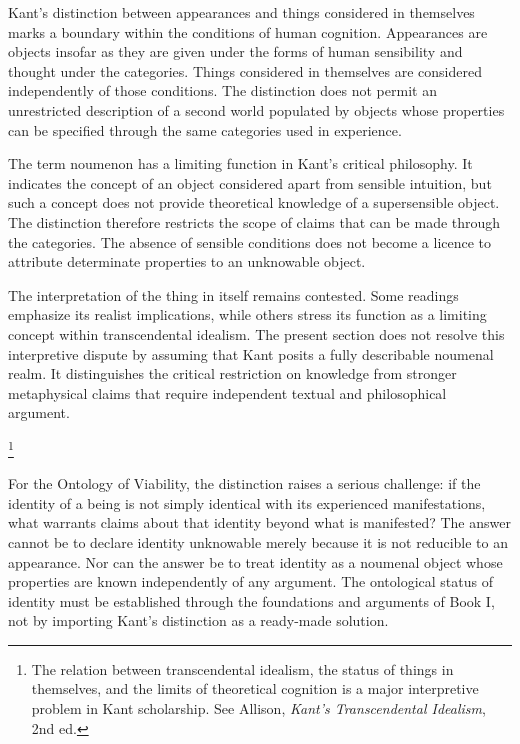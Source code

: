 Kant's distinction between appearances and things
considered in themselves marks a boundary within
the conditions of human cognition. Appearances
are objects insofar as they are given under
the forms of human sensibility and thought
under the categories. Things considered in
themselves are considered independently of
those conditions. The distinction does not
permit an unrestricted description of a
second world populated by objects whose
properties can be specified through the
same categories used in experience.
\cite[A235/B294--A260/B315]{KantCritiquePureReason}

\label{para:VS.B01.P01.C08.S10.SS11.P002}

The term noumenon has a limiting function
in Kant's critical philosophy. It indicates
the concept of an object considered apart
from sensible intuition, but such a concept
does not provide theoretical knowledge of
a supersensible object. The distinction
therefore restricts the scope of claims
that can be made through the categories.
The absence of sensible conditions does
not become a licence to attribute determinate
properties to an unknowable object.

\label{para:VS.B01.P01.C08.S10.SS11.P003}

The interpretation of the thing in itself
remains contested. Some readings emphasize
its realist implications, while others
stress its function as a limiting concept
within transcendental idealism. The present
section does not resolve this interpretive
dispute by assuming that Kant posits a
fully describable noumenal realm. It
distinguishes the critical restriction
on knowledge from stronger metaphysical
claims that require independent textual
and philosophical argument.

\footnote{The relation between transcendental idealism,
the status of things in themselves, and the limits
of theoretical cognition is a major interpretive
problem in Kant scholarship. See Allison,
\textit{Kant's Transcendental Idealism}, 2nd ed.}

\label{para:VS.B01.P01.C08.S10.SS11.P004}

For the Ontology of Viability, the distinction
raises a serious challenge: if the identity
of a being is not simply identical with
its experienced manifestations, what
warrants claims about that identity beyond
what is manifested? The answer cannot
be to declare identity unknowable merely
because it is not reducible to an appearance.
Nor can the answer be to treat identity
as a noumenal object whose properties
are known independently of any argument.
The ontological status of identity must
be established through the foundations
and arguments of Book I, not by importing
Kant's distinction as a ready-made solution.

